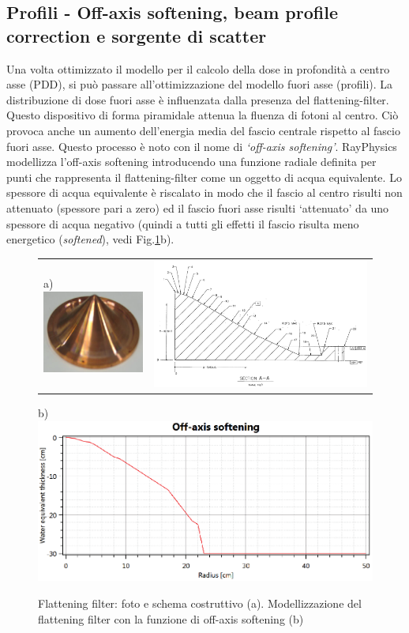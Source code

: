\subsection{Profili - Off-axis softening, beam profile correction e sorgente di scatter}
Una volta ottimizzato il modello per il calcolo della dose in profondità a centro asse (PDD), si può passare all'ottimizzazione del modello fuori asse (profili). La distribuzione di dose fuori asse è influenzata dalla presenza del flattening-filter. Questo dispositivo di forma piramidale attenua la fluenza di fotoni al centro. Ciò provoca anche un aumento dell'energia media del fascio centrale rispetto al fascio fuori asse. Questo processo è noto con il nome di \textit{`off-axis softening'}. RayPhysics modellizza l'off-axis softening introducendo una funzione radiale definita per punti che rappresenta il flattening-filter come un oggetto di acqua equivalente. Lo spessore di acqua equivalente è riscalato in modo che il fascio al centro risulti non attenuato (spessore pari a zero) ed il fascio fuori asse risulti `attenuato' da uno spessore di acqua negativo (quindi a tutti gli effetti il fascio risulta meno energetico (\textit{softened}), vedi Fig.\ref{fig:Ray_flatt}b).
\begin{figure}
\centering
\begin{tabular}{m{}m{}}
\vspace*{-0.5cm}a)\includegraphics[width=.3\textwidth]{./cap2/Ray_flatt1.png} &
\includegraphics[width=.6\textwidth]{./cap2/Ray_flatt2.png}
\end{tabular}
b)\includegraphics[width=.9\textwidth]{./cap2/Ray_flatt3.png}
\caption{Flattening filter: foto e schema costruttivo (a). Modellizzazione del flattening filter con la funzione di off-axis softening (b)}
\label{fig:Ray_flatt}
\end{figure}

